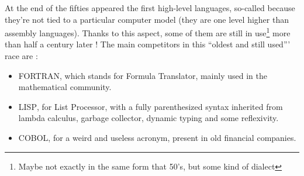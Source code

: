 \documentclass[a4paper]{article}
\begin{document}
At the end of the fifties appeared the first high-level languages, so-called because they're not tied to a particular computer model (they are one level higher than assembly languages). Thanks to this aspect, some of them are still in use\footnote{Maybe not exactly in the same form that 50's, but some kind of dialect} more than half a century later ! The main competitors in this ``oldest and still used''' race are :\begin{itemize}
\item
\textsc{FORTRAN}, which stands for Formula Translator, mainly used in the mathematical community. 
\item
\textsc{LISP}, for List Processor, with a fully parenthesized syntax inherited from lambda calculus, garbage collector, dynamic typing and some reflexivity.
\item
\textsc{COBOL}, for a weird and useless acronym, present in old financial companies.
\end{itemize}
\end{document}
